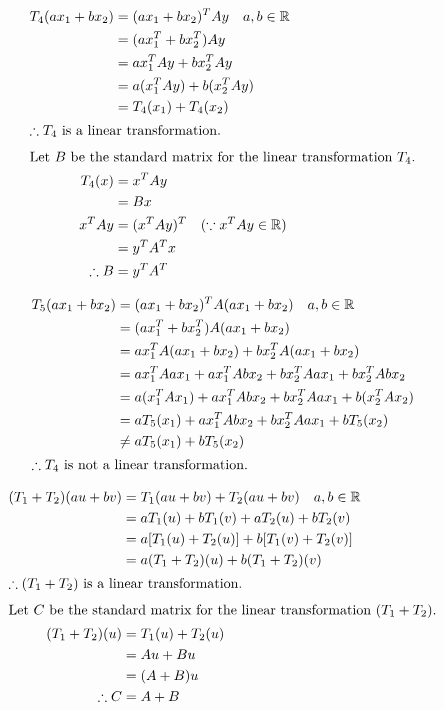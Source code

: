 \documentclass[12pt]{article}
\newenvironment{problem}[2][Problem]{\begin{trivlist}
\item[\hskip \labelsep {\bfseries #1}\hskip \labelsep {\bfseries #2.}]}{\end{trivlist}}
\begin{document}
\begin{problem}{1.d}
\end{problem}
\begin{align*}
T_4 (ax_1 + bx_2) &= (ax_1 + bx_2)^T A y \quad a, b \in \mathbb{R}\\
&= (ax_1^T + bx_2^T) A y\\
&= ax_1^T A y + bx_2^T A y\\
&= a(x_1^T A y) + b(x_2^T A y)\\
&= T_4(x_1) + T_4(x_2) \\
\intertext{$\therefore T_4$ is a linear transformation.}
\intertext{Let $B$ be the standard matrix for the linear transformation $T_4$.}
T_4(x) &= x^T A y\\
&= Bx\\
x^T A y &= (x^T A y)^T \quad (\because x^T A y \in \mathbb{R})\\
&= y^T A^T x\\
\therefore B &= y^T A^T
\end{align*}
\filbreak

\begin{problem}{1.a}
\end{problem}
\begin{align*}
T_5 (ax_1 + bx_2) &= (ax_1 + bx_2)^T A (ax_1 + bx_2) \quad a, b \in \mathbb{R}\\
&= (ax_1^T + bx_2^T) A (ax_1 + bx_2)\\
&= ax_1^T A (ax_1 + bx_2) + bx_2^T A (ax_1 + bx_2) \\
&= ax_1^T A ax_1 + ax_1^T A bx_2 + bx_2^T A ax_1 + bx_2^T A bx_2 \\
&= a(x_1^T A x_1) + ax_1^T A bx_2 + bx_2^T A ax_1 + b(x_2^T A x_2) \\
&= aT_5(x_1) + ax_1^T A bx_2 + bx_2^T A ax_1 + bT_5(x_2) \\
&\ne aT_5(x_1) + bT_5(x_2) \\
\intertext{$\therefore T_4$ is not a linear transformation.}
\end{align*}
\filbreak

\begin{problem}{2.a}
\end{problem}
\begin{align*}
(T_1 + T_2)(au + bv) &= T_1(au + bv) + T_2(au + bv) \quad a, b \in \mathbb{R}\\
&= aT_1(u) + bT_1(v) + aT_2(u) + bT_2(v)\\
&= a[T_1(u) + T_2(u)] + b[T_1(v) + T_2(v)]\\
&= a(T_1 + T_2)(u) + b(T_1 + T_2)(v)\\
\intertext{$\therefore (T_1+T_2)$ is a linear transformation.}
\intertext{Let $C$ be the standard matrix for the linear transformation $(T_1 + T_2)$.}
(T_1 + T_2)(u) &= T_1(u) + T_2(u)\\ 
&= Au + Bu\\
&= (A + B)u\\
\therefore C &= A+B
\end{align*}
\filbreak
\end{document}
